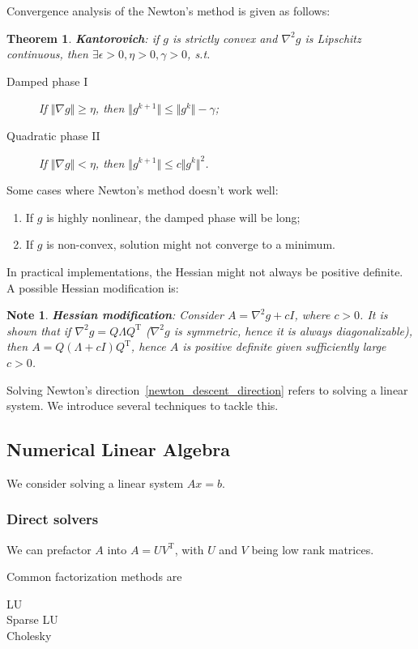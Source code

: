 \documentclass{fancydoc}
\newtheorem{thm}{Theorem}
\newtheorem{note}{Note}
\newcommand{\trans}{\mathrm{T}}
\begin{document}
Convergence analysis of the Newton's method is given as follows:
\begin{thm}
\textbf{Kantorovich}: if $g$ is strictly convex and $\nabla^2 g$ is Lipschitz continuous, then $\exists \epsilon > 0, \eta > 0, \gamma > 0$, s.t.
\begin{description}
	\item[Damped phase I] If $\Vert\nabla g \Vert \geq \eta$, then $\Vert g^{k+1} \Vert \leq \Vert g^{k} \Vert - \gamma$;
	\item[Quadratic phase II] If $\Vert\nabla g \Vert < \eta$, then $\Vert g^{k+1} \Vert \leq c \Vert g^{k}\Vert^2$.
\end{description}
\end{thm}
Some cases where Newton's method doesn't work well:
\begin{enumerate}
	\item If $g$ is highly nonlinear, the damped phase will be long;
	\item If $g$ is non-convex, solution might not converge to a minimum.
\end{enumerate}
In practical implementations, the Hessian might not always be positive definite. A possible Hessian modification is:
\begin{note}
	\textbf{Hessian modification}: Consider $A = \nabla^2 g + cI$, where $c>0$. It is shown that if $\nabla^2 g = Q\Lambda Q^\trans$ ($\nabla^2 g$ is symmetric, hence it is always diagonalizable), then $A=Q(\Lambda + cI)Q^\trans$, hence $A$ is positive definite given sufficiently large $c>0$. 
\end{note}

Solving Newton's direction~\eqref{newton_descent_direction} refers to solving a linear system. We introduce several techniques to tackle this.

\subsection{Numerical Linear Algebra}
We consider solving a linear system $Ax = b$.
\subsubsection{Direct solvers}
We can prefactor $A$ into $A = UV^\trans$, with $U$ and $V$ being low rank matrices.

Common factorization methods are
\begin{description}
	\item[LU]
	\item[Sparse LU]
	\item[Cholesky]
\end{description}
 
\end{document}
